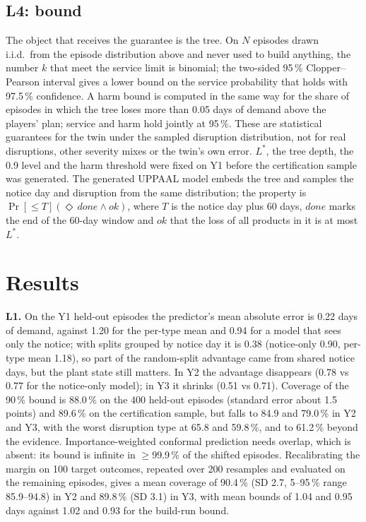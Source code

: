 \documentclass{ifacconf}
\begin{document}
\subsection{L4: bound}
The object that receives the guarantee is the tree. On $N$ episodes drawn i.i.d.\ from the episode distribution
above and never used to build anything, the number $k$ that meet the service limit is binomial; the two-sided
95\,\% Clopper--Pearson interval \citep{clopper1934} gives a lower bound on the service probability that holds
with 97.5\,\% confidence. A harm bound is computed in the same way for the share of episodes in which the tree
loses more than 0.05 days of demand above the players' plan; service and harm hold jointly at 95\,\%. These are
statistical guarantees for the twin under the sampled disruption distribution, not for real disruptions, other
severity mixes or the twin's own error. $L^*$, the tree depth, the 0.9 level and the harm threshold were fixed on
Y1 before the certification sample was generated. The generated UPPAAL model embeds the tree and samples the
notice day and disruption from the same distribution; the property is
$\Pr[\le T](\Diamond\, \mathit{done} \wedge \mathit{ok})$, where $T$ is the notice day plus 60 days, $\mathit{done}$
marks the end of the 60-day window and $\mathit{ok}$ that the loss of all products in it is at most $L^*$.

\section{Results}

\textbf{L1.} On the Y1 held-out episodes the predictor's mean absolute error is 0.22 days of demand, against
1.20 for the per-type mean and 0.94 for a model that sees only the notice; with splits grouped by notice day it is
0.38 (notice-only 0.90, per-type mean 1.18), so part of the random-split advantage came from shared notice days, but the plant
state still matters. In Y2 the advantage disappears (0.78 vs 0.77 for the notice-only model); in Y3 it shrinks
(0.51 vs 0.71). Coverage of the 90\,\% bound is 88.0\,\% on the 400 held-out episodes (standard error about 1.5
points) and 89.6\,\% on the certification sample, but falls to 84.9 and 79.0\,\% in Y2 and Y3, with the worst
disruption type at 65.8 and 59.8\,\%, and to 61.2\,\% beyond the evidence. Importance-weighted conformal prediction needs overlap,
which is absent: its bound is infinite in $\ge$99.9\,\% of the shifted episodes. Recalibrating the margin on 100 target outcomes, repeated over 200 resamples and evaluated on the
remaining episodes, gives a mean coverage of 90.4\,\% (SD 2.7, 5--95\,\% range 85.9--94.8) in Y2 and 89.8\,\% (SD
3.1) in Y3, with mean bounds of 1.04 and 0.95 days against 1.02 and 0.93 for the build-run bound.
\end{document}
